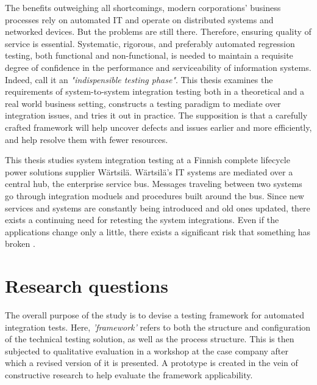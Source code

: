 \documentclass[12pt,a4paper,oneside,pdftex]{report}
\begin{document}
The benefits outweighing all shortcomings, modern corporations' business processes rely on automated IT and operate on distributed systems and networked devices. But the problems are still there. Therefore, ensuring quality of service is essential. Systematic, rigorous, and preferably automated regression testing, both functional and non-functional, is needed to maintain a requisite degree of confidence in the performance and serviceability of information systems. Indeed, \citet{rehman2007testing} call it an \emph{"indispensible testing phase"}. This thesis examines the requirements of system-to-system integration testing both in a theoretical and a real world business setting, constructs a testing paradigm to mediate over integration issues, and tries it out in practice. The supposition is that a carefully crafted framework will help uncover defects and issues earlier and more efficiently, and help resolve them with fewer resources.


This thesis studies system integration testing at a Finnish complete lifecycle power solutions supplier Wärtsilä. Wärtsilä's IT systems are mediated over a central hub, the enterprise service bus. Messages traveling between two systems go through integration moduels and procedures built around the bus. Since new services and systems are constantly being introduced and old ones updated, there exists a continuing need for retesting the system integrations. Even if the applications change only a little, there exists a significant risk that something has broken \citep{pezze2008software}. 


\section{Research questions}

The overall purpose of the study is to devise a testing framework for automated integration tests. Here, \emph{'framework'} refers to both the structure and configuration of the technical testing solution, as well as the process structure. This is then subjected to qualitative evaluation in a workshop at the case company after which a revised version of it is presented. A prototype is created in the vein of constructive research to help evaluate the framework applicability.
\end{document}
